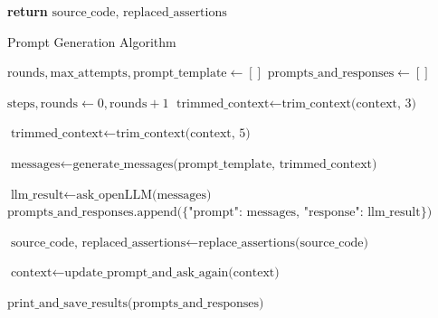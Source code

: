 \begin{enumerate}
\begin{enumerate}
\begin{algorithm}
\begin{algorithmic}[1]
            \State \textbf{return} $\text{source\_code, replaced\_assertions}$
        \EndFunction
        \end{algorithmic}
        \end{algorithm}
        
        \begin{algorithm}
            \caption{Prompt Generation Algorithm}
            \label{algorithm_prompt_generation}
            \begin{algorithmic}[1]
                    \State $\text{rounds}, \text{max\_attempts}, \text{prompt\_template} \gets []$ 
                    \State $\text{prompts\_and\_responses} \gets []$
                    
                        \State $\text{steps}, \text{rounds} \gets 0, \text{rounds} + 1$
                            \State $\text{trimmed\_context} \gets \text{trim\_context(context, 3)}$ 
                        \EndIf
                        
                            \State $\text{trimmed\_context} \gets \text{trim\_context(context, 5)}$ 
                        \EndIf
                        
                        \State $\text{messages} \gets \text{generate\_messages(prompt\_template, trimmed\_context)}$
                        
                        \State $\text{llm\_result} \gets \text{ask\_openLLM(messages)}$
                        \State $\text{prompts\_and\_responses.append(\{"prompt": messages, "response": llm\_result\})}$
                        
                        \State $\text{source\_code, replaced\_assertions} \gets \text{replace\_assertions(source\_code)}$
                        
                            \State $\text{context} \gets \text{update\_prompt\_and\_ask\_again(context)}$
                        \EndIf
                    \EndWhile
                    
                    \State $\text{print\_and\_save\_results(prompts\_and\_responses)}$
                \EndFunction
            \end{algorithmic}
        \end{algorithm}
        

\end{enumerate}
\end{enumerate}
